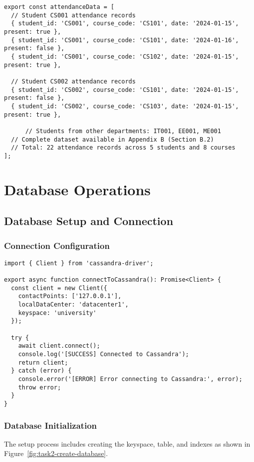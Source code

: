 \begin{verbatim}
export const attendanceData = [
  // Student CS001 attendance records
  { student_id: 'CS001', course_code: 'CS101', date: '2024-01-15', present: true },
  { student_id: 'CS001', course_code: 'CS101', date: '2024-01-16', present: false },
  { student_id: 'CS001', course_code: 'CS102', date: '2024-01-15', present: true },

  // Student CS002 attendance records
  { student_id: 'CS002', course_code: 'CS101', date: '2024-01-15', present: false },
  { student_id: 'CS002', course_code: 'CS103', date: '2024-01-15', present: true },

      // Students from other departments: IT001, EE001, ME001
  // Complete dataset available in Appendix B (Section B.2)
  // Total: 22 attendance records across 5 students and 8 courses
];
\end{verbatim}

\section{Database Operations}

\subsection{Database Setup and Connection}

\subsubsection{Connection Configuration}
\begin{verbatim}
import { Client } from 'cassandra-driver';

export async function connectToCassandra(): Promise<Client> {
  const client = new Client({
    contactPoints: ['127.0.0.1'],
    localDataCenter: 'datacenter1',
    keyspace: 'university'
  });

  try {
    await client.connect();
    console.log('[SUCCESS] Connected to Cassandra');
    return client;
  } catch (error) {
    console.error('[ERROR] Error connecting to Cassandra:', error);
    throw error;
  }
}
\end{verbatim}

\subsubsection{Database Initialization}
The setup process includes creating the keyspace, table, and indexes as shown in Figure~\ref{fig:task2-create-database}.

